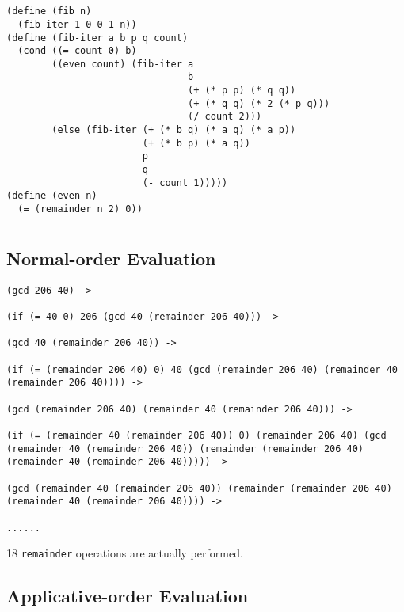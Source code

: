 \documentclass[a4paper]{report}
\begin{document}
\section{}

\begin{lstlisting}
(define (fib n)
  (fib-iter 1 0 0 1 n))
(define (fib-iter a b p q count)
  (cond ((= count 0) b)
        ((even count) (fib-iter a
                                b
                                (+ (* p p) (* q q))
                                (+ (* q q) (* 2 (* p q)))
                                (/ count 2)))
        (else (fib-iter (+ (* b q) (* a q) (* a p))
                        (+ (* b p) (* a q))
                        p
                        q
                        (- count 1)))))
(define (even n)
  (= (remainder n 2) 0))
\end{lstlisting}


\section{}

\subsection*{Normal-order Evaluation}

\begin{lstlisting}
(gcd 206 40) ->

(if (= 40 0) 206 (gcd 40 (remainder 206 40))) ->

(gcd 40 (remainder 206 40)) ->

(if (= (remainder 206 40) 0) 40 (gcd (remainder 206 40) (remainder 40 (remainder 206 40)))) ->

(gcd (remainder 206 40) (remainder 40 (remainder 206 40))) ->

(if (= (remainder 40 (remainder 206 40)) 0) (remainder 206 40) (gcd (remainder 40 (remainder 206 40)) (remainder (remainder 206 40) (remainder 40 (remainder 206 40))))) ->

(gcd (remainder 40 (remainder 206 40)) (remainder (remainder 206 40) (remainder 40 (remainder 206 40)))) ->

......
\end{lstlisting}

18 \lstinline{remainder} operations are actually performed.

\subsection*{Applicative-order Evaluation}
\end{document}
